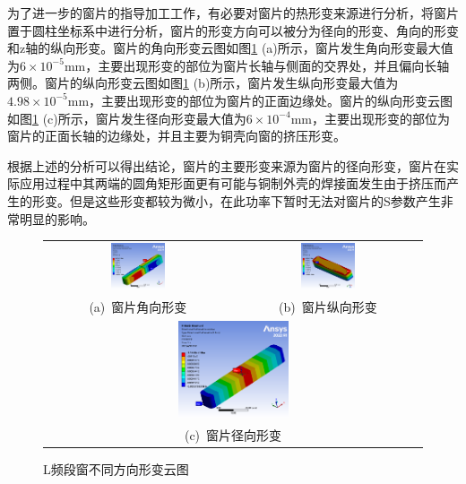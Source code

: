 \documentclass[master]{thesis-uestc}
\begin{document}
为了进一步的窗片的指导加工工作，有必要对窗片的热形变来源进行分析，将窗片置于圆柱坐标系中进行分析，窗片的形变方向可以被分为径向的形变、角向的形变和z轴的纵向形变。窗片的角向形变云图如图\ref{fig:L频段窗不同方向形变} (a)所示，窗片发生角向形变最大值为\(6 \times 10^{-5}\)mm，主要出现形变的部位为窗片长轴与侧面的交界处，并且偏向长轴两侧。窗片的纵向形变云图如图\ref{fig:L频段窗不同方向形变} (b)所示，窗片发生纵向形变最大值为\(4.98 \times 10^{-5}\)mm，主要出现形变的部位为窗片的正面边缘处。窗片的纵向形变云图如图\ref{fig:L频段窗不同方向形变} (c)所示，窗片发生径向形变最大值为\(6 \times 10^{-4}\)mm，主要出现形变的部位为窗片的正面长轴的边缘处，并且主要为铜壳向窗的挤压形变。

根据上述的分析可以得出结论，窗片的主要形变来源为窗片的径向形变，窗片在实际应用过程中其两端的圆角矩形面更有可能与铜制外壳的焊接面发生由于挤压而产生的形变。但是这些形变都较为微小，在此功率下暂时无法对窗片的S参数产生非常明显的影响。
\begin{figure}[!htbp]
    \small
    \centering
    \begin{tabular}{@{\ }c@{\ }c}
        \includegraphics[width=0.3\textwidth]{pic/chapter4/L角向形变.png} & 
        \hspace{5pt}
        \includegraphics[width=0.3\textwidth]{pic/chapter4/L纵向形变.png}     \\
        \mbox{\small (a) 窗片角向形变}                                                                               & 
        \mbox{\small (b) 窗片纵向形变}                                                                                  \\[6bp]
        \multicolumn{2}{c}{\includegraphics[width=0.3\textwidth]{pic/chapter4/L径向形变.png}} \\  %
        \multicolumn{2}{c}{\mbox{\small (c) 窗片径向形变}}
    \end{tabular}
    \caption{L频段窗不同方向形变云图}
    \label{fig:L频段窗不同方向形变}
\end{figure}
\end{document}
